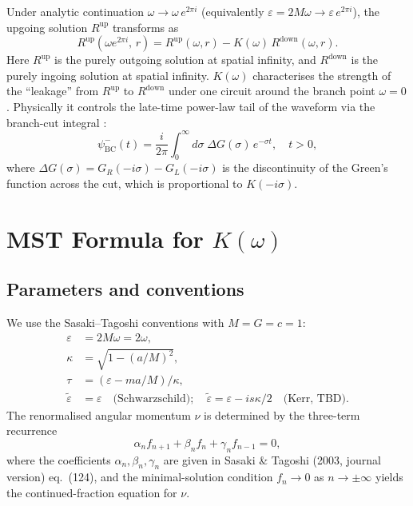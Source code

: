 \documentclass[12pt,a4paper]{article}
\newcommand{\Rup}{R^{\mathrm{up}}}
\newcommand{\Rdown}{R^{\mathrm{down}}}
\begin{document}
Under analytic continuation $\omega \to \omega\,e^{2\pi i}$
(equivalently $\varepsilon = 2M\omega \to \varepsilon\,e^{2\pi i}$),
the upgoing solution $\Rup$ transforms as \cite{Leaver1986}
\begin{equation}
  \Rup\!\left(\omega e^{2\pi i},\, r\right)
  = \Rup(\omega, r) - K(\omega)\,\Rdown(\omega, r).
  \label{eq:connection}
\end{equation}
Here $\Rup$ is the purely outgoing solution at spatial infinity,
and $\Rdown$ is the purely ingoing solution at spatial infinity.
$K(\omega)$ characterises the strength of the ``leakage'' from $\Rup$ to $\Rdown$
under one circuit around the branch point $\omega = 0$.
Physically it controls the late-time power-law tail of the waveform via
the branch-cut integral \cite{Leaver1986}:
\begin{equation}
  \psi_{\mathrm{BC}}^-(t) = \frac{i}{2\pi}\int_0^\infty d\sigma\;
    \Delta G(\sigma)\,e^{-\sigma t},
    \quad t > 0,
    \label{eq:BC}
\end{equation}
where $\Delta G(\sigma) = G_R(-i\sigma) - G_L(-i\sigma)$ is the discontinuity of
the Green's function across the cut, which is proportional to $K(-i\sigma)$.

\section{MST Formula for \texorpdfstring{$K(\omega)$}{K(omega)}}

\subsection{Parameters and conventions}

We use the Sasaki--Tagoshi conventions with $M = G = c = 1$:
\begin{align}
  \varepsilon &= 2M\omega = 2\omega,\label{eq:eps}\\
  \kappa &= \sqrt{1 - (a/M)^2},\label{eq:kappa}\\
  \tau &= (\varepsilon - ma/M)/\kappa,\label{eq:tau}\\
  \tilde{\varepsilon} &= \varepsilon \quad \text{(Schwarzschild)};
    \quad \tilde{\varepsilon} = \varepsilon - is\kappa/2 \quad \text{(Kerr, TBD)}.
    \label{eq:epstilde}
\end{align}
The renormalised angular momentum $\nu$ is determined by the three-term recurrence
\begin{equation}
  \alpha_n f_{n+1} + \beta_n f_n + \gamma_n f_{n-1} = 0,
  \label{eq:recurrence}
\end{equation}
where the coefficients $\alpha_n, \beta_n, \gamma_n$ are given in
Sasaki \& Tagoshi (2003, journal version) eq.\ (124),
and the minimal-solution condition $f_n \to 0$ as $n \to \pm\infty$
yields the continued-fraction equation for $\nu$.
\end{document}
